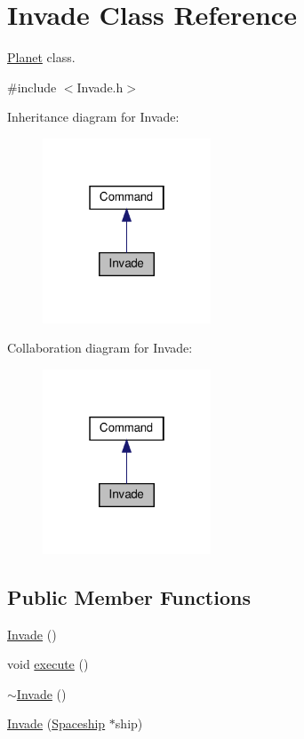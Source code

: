 \hypertarget{classInvade}{}\section{Invade Class Reference}
\label{classInvade}


\hyperlink{classPlanet}{Planet} class.  




{\ttfamily \#include $<$Invade.\+h$>$}



Inheritance diagram for Invade\+:\nopagebreak
\begin{figure}[H]
\begin{center}
\leavevmode
\includegraphics[width=142pt]{classInvade__inherit__graph}
\end{center}
\end{figure}


Collaboration diagram for Invade\+:\nopagebreak
\begin{figure}[H]
\begin{center}
\leavevmode
\includegraphics[width=142pt]{classInvade__coll__graph}
\end{center}
\end{figure}
\subsection*{Public Member Functions}
\begin{DoxyCompactItemize}
\item 
\hyperlink{classInvade_a7abfb047bd3df1e5d44a0c65701b58bd}{Invade} ()
\item 
void \hyperlink{classInvade_a111ebe8b6c5a3646b697ca906c815b35}{execute} ()
\item 
\hyperlink{classInvade_a54e5cbe56b8748809beda7d798546103}{$\sim$\+Invade} ()
\item 
\hyperlink{classInvade_a5fdc8e1f96494355363666c6ef5a4fac}{Invade} (\hyperlink{classSpaceship}{Spaceship} $\ast$ship)
\end{DoxyCompactItemize}


